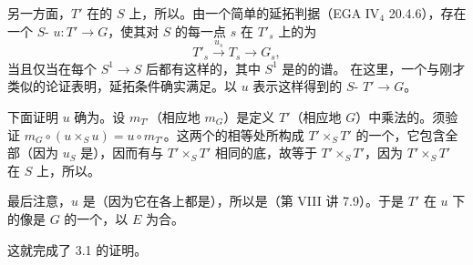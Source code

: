 另一方面，$T'$ 在的 $S$ 上，所以。由一个简单的延拓判据（EGA IV$_4$ 20.4.6），存在一个 $S$- $u:T'\to G$，使其对 $S$ 的每一点 $s$ 在 $T'_s$ 上的为
\[T'_s\xrightarrow{u_s}T_s\longrightarrow G_s,\]
当且仅当在每个 $S^1\to S$ 后都有这样的，其中 $S^1$ 是的的谱。
在这里，一个与刚才类似的论证表明，延拓条件确实满足。以 $u$ 表示这样得到的 $S$- $T'\to G$。

下面证明 $u$ 确为。设 $m_{T'}$（相应地 $m_G$）是定义 $T'$（相应地 $G$）中乘法的。须验证 $m_G\circ(u\times_S u)=u\circ m_{T'}$。这两个的相等处所构成 $T'\times_S T'$ 的一个，它包含全部（因为 $u_S$ 是），因而有与 $T'\times_S T'$ 相同的底，故等于 $T'\times_S T'$，因为 $T'\times_S T'$ 在 $S$ 上，所以。

最后注意，$u$ 是（因为它在各上都是），所以是（第 VIII 讲 7.9）。于是 $T'$ 在 $u$ 下的像是 $G$ 的一个，以 $E$ 为合。

这就完成了 3.1 的证明。

